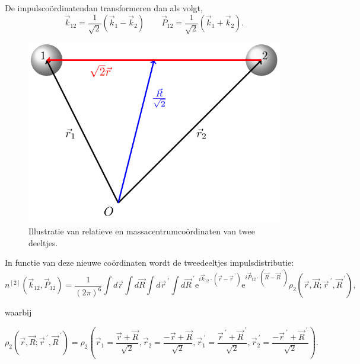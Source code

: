 \documentclass[11pt,twoside]{book}
\begin{document}
De impulsco\"{o}rdinatendan transformeren dan als volgt,
\begin{equation} \label{eq:rcm_impusl}
\vec{k}_{12}= \frac{1}{\sqrt{2}} \left(\vec{k}_1 - \vec{k}_2\right) \qquad \vec{P}_{12}= \frac{1}{\sqrt{2}} \left(\vec{k}_1 + \vec{k}_2\right).
\end{equation}
\begin{figure}[H]
\centering
\includegraphics[scale=0.7]{./figuren/jacobi.pdf}
\caption{ Illustratie van relatieve en massacentrumco\"{o}rdinaten van twee deeltjes.}
\label{fig:coordinates}
\end{figure}
In functie van deze nieuwe co\"{o}rdinaten wordt de tweedeeltjes impulsdistributie:
\begin{equation} \label{eq:twobodydist}
n^{[2]}(\vec{k}_{12},\vec{P}_{12})=\frac{1}{(2\pi)^6}
						\int d\vec{r} \int d\vec{R} \int d\vec{r}^{\ \prime} \int d\vec{R}^{\ \prime} 
    						\mathrm{e}^{i\vec{k}_{12}\cdot (\vec{r}-\vec{r}^{\ \prime})} 
    						\mathrm{e}^{i\vec{P}_{12}\cdot(\vec{R}-\vec{R}^{\ \prime})} 
    						\rho_2(\vec{r},\vec{R}; \vec{r}^{\ \prime},\vec{R}^{\ \prime}),
\end{equation}

waarbij

\begin{equation} \label{eq:twobodydensity}
\rho_2(\vec{r},\vec{R}; \vec{r}^{\ \prime},\vec{R}^{\ \prime}) = 
							\rho_2\left(	
							\vec{r}_1=\frac{\vec{r} + \vec{R}}{\sqrt{2}},
							\vec{r}_2=\frac{-\vec{r} + \vec{R}}{\sqrt{2}},
						    \vec{r}_1^{\ \prime}=\frac{\vec{r}^{\ \prime} + \vec{R}^{\ \prime}}{\sqrt{2}},	
						    \vec{r}_2^{\ \prime}=\frac{-\vec{r}^{\ \prime} + \vec{R}^{\ \prime}}{\sqrt{2}}
						    \right).
\end{equation}
\end{document}
